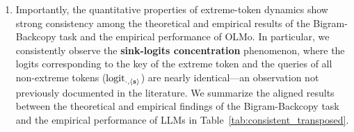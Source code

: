 \begin{enumerate}[leftmargin=2em]
\item Importantly, the quantitative properties of extreme-token dynamics show strong consistency among the theoretical and empirical results of the Bigram-Backcopy task and the empirical performance of OLMo. In particular, we consistently observe the \textbf{sink-logits concentration} phenomenon, where the logits corresponding to the key of the extreme token and the queries of all non-extreme tokens ($ \text{logit}_{\cdot,\texttt{$\langle \texttt{s}\rangle$}}$) are nearly identical—an observation not previously documented in the literature. We summarize the aligned results between the theoretical and empirical findings of the Bigram-Backcopy task and the empirical performance of LLMs in Table~\ref{tab:consistent_transposed}. 


\end{enumerate}
